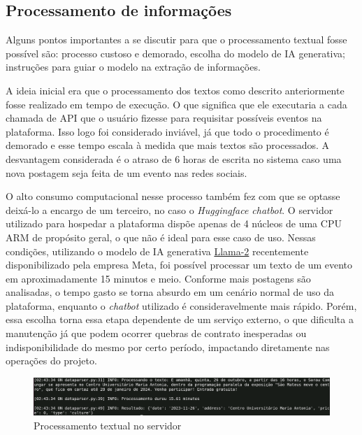 \subsection{Processamento de informações}
\label{sec:infoProcessing}

Alguns pontos importantes a se discutir para que o processamento textual fosse
possível são: processo custoso e demorado, escolha do modelo de \acs{IA}
generativa; instruções para guiar o modelo na extração de informações.

A ideia inicial era que o processamento dos textos como descrito anteriormente
fosse realizado em tempo de execução. O que significa que ele executaria a cada
chamada de \acs{API} que o usuário fizesse para requisitar possíveis eventos na
plataforma. Isso logo foi considerado inviável, já que todo o procedimento é
demorado e esse tempo escala à medida que mais textos são processados. A
desvantagem considerada é o atraso de 6 horas de escrita no sistema caso uma
nova postagem seja feita de um evento nas redes sociais.

O alto consumo computacional nesse processo também fez com que se optasse
deixá-lo a encargo de um terceiro, no caso o \textit{Huggingface chatbot}. O
servidor utilizado para hospedar a plataforma dispõe apenas de 4 núcleos de uma
CPU ARM de propósito geral, o que não é ideal para esse caso de uso. Nessas
condições, utilizando o modelo de \acs{IA} generativa
\href{https://huggingface.co/TheBloke/Llama-2-13B-chat-GGUF}{Llama-2}
recentemente disponibilizado pela empresa Meta, foi possível processar um texto
de um evento em aproximadamente 15 minutos e meio. Conforme mais postagens são
analisadas, o tempo gasto se torna absurdo em um cenário normal de uso da
plataforma, enquanto o \textit{chatbot} utilizado é consideravelmente mais
rápido. Porém, essa escolha torna essa etapa dependente de um serviço externo,
o que dificulta a manutenção já que podem ocorrer quebras de contrato
inesperadas ou indisponibilidade do mesmo por certo período, impactando
diretamente nas operações do projeto.

\begin{figure}[h]
    \centering
    \includegraphics[width=1\textwidth]{figuras/llama_2_local.png}
    \caption{Processamento textual no servidor}
\end{figure}

